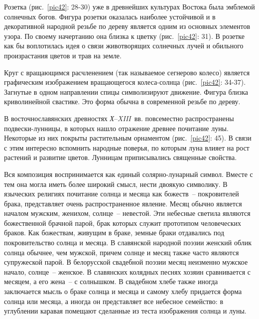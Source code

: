 \documentclass[pscyr,titlepage,chapters]{hedreport}
\begin{document}
  Розетка (рис.~\ref{pic42}: 28-30) уже в древнейших культурах Востока была
  эмблемой солнечных богов. Фигура розетки оказалась наиболее устойчивой и в
  декоративной народной резьбе по дереву является одним из основных элементов
  узора. По своему начертанию она близка к цветку (рис.~\ref{pic42}: 31). В
  розетке как бы воплотилась идея о связи животворящих солнечных лучей и
  обильного произрастания цветов и трав на земле.

  Круг с вращающимся расчленением (так называемое сегнерово колесо) является
  графическим изображением вращающегося колеса-солнца (рис.~\ref{pic42}: 34-37).
  Загнутые в одном направлении спицы символизируют движение. Фигура близка
  криволинейной свастике. Это форма обычна в современной резьбе по дереву.

  В восточнославянских древностях \emph{Х}--\emph{XIII}~вв. повсеместно
  распространены подвески-лунницы, в которых нашло отражение древнее почитание
  луны. Некоторые из них покрыты растительным орнаментом (рис.~\ref{pic42}: 45).
  В связи с этим интересно вспомнить народные поверья, по которым луна влияет на
  рост растений и развитие цветов. Лунницам приписывались священные свойства.

  Вся композиция воспринимается как единый солярно-лунарный символ. Вместе с тем
  она могла иметь более широкий смысл, нести двоякую символику. В языческих
  религиях почитание солнца и месяца как божеств~-- покровителей брака,
  представляет очень распространенное явление. Месяц обычно является началом
  мужским, женихом, солнце~-- невестой. Эти небесные светила являются
  божественной брачной парой, брак которых служит прототипом человеческих
  браков. Как божествам, живущим в браке, земные браки отдавались под
  покровительство солнца и месяца. В славянской народной поэзии женский облик
  солнца обычнее, чем мужской, причем солнце и месяц также часто являются
  супружеской парой. В белорусской свадебной поэзии месяц неизменно мужское
  начало, солнце~-- женское. В славянских колядных песнях хозяин сравнивается с
  месяцем, а его жена~-- с солнышком. В свадебном хлебе также иногда заключается
  мысль о браке солнца и месяца и самому хлебу придается форма солнца или
  месяца, а иногда он представляет все небесное семейство: в углублении каравая
  помещают сделанные из теста изображения солнца и луны.
\end{document}
